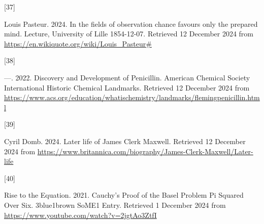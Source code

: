 \documentclass[
  a4paper,
]{article}
\newlength{\cslhangindent}
\newlength{\csllabelwidth}
\newenvironment{CSLReferences}[2] %
 {\begin{list}{}{%
  \setlength{\itemindent}{0pt}
  \setlength{\leftmargin}{0pt}
  \setlength{\parsep}{0pt}
  \ifodd #1
   \setlength{\leftmargin}{\cslhangindent}
   \setlength{\itemindent}{-1\cslhangindent}
  \fi
  \setlength{\itemsep}{#2\baselineskip}}}
 {\end{list}}
\newcommand{\CSLLeftMargin}[1]{\parbox[t]{\csllabelwidth}{\strut#1\strut}}
\newcommand{\CSLRightInline}[1]{\parbox[t]{\linewidth - \csllabelwidth}{\strut#1\strut}}
\begin{document}
\begin{CSLReferences}{0}{0}
\CSLLeftMargin{{[}37{]} }%
\CSLRightInline{Louis Pasteur. 2024. {In the fields of observation
chance favours only the prepared mind}. {Lecture, University of Lille
1854-12-07}. Retrieved 12 December 2024 from
\url{https://en.wikiquote.org/wiki/Louis_Pasteur\#}}

\CSLLeftMargin{{[}38{]} }%
\CSLRightInline{---. 2022. {Discovery and Development of Penicillin}.
{American Chemical Society International Historic Chemical Landmarks}.
Retrieved 12 December 2024 from
\url{https://www.acs.org/education/whatischemistry/landmarks/flemingpenicillin.html}}

\CSLLeftMargin{{[}39{]} }%
\CSLRightInline{Cyril Domb. 2024. {Later life of James Clerk Maxwell}.
Retrieved 12 December 2024 from
\url{https://www.britannica.com/biography/James-Clerk-Maxwell/Later-life}}

\CSLLeftMargin{{[}40{]} }%
\CSLRightInline{Rise to the Equation. 2021. {Cauchy's Proof of the Basel
Problem \textbar{} Pi Squared Over Six}. {3blue1brown SoME1 Entry}.
Retrieved 1 December 2024 from
\url{https://www.youtube.com/watch?v=2jgtAo3ZtfI}}

\end{CSLReferences}
\end{document}
